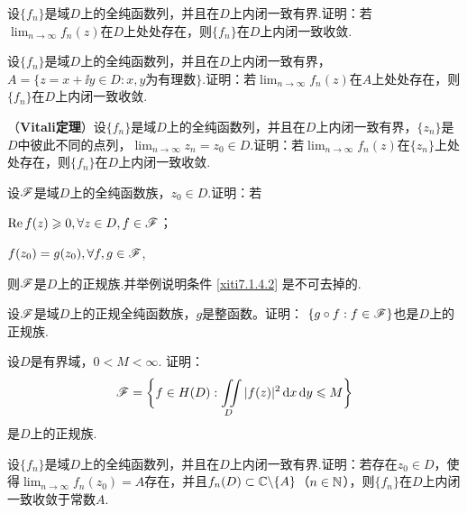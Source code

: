 \begin{xiti}
\item 设$\{f_n\}$是域$D$上的全纯函数列，并且在$D$上内闭一致有界.证明：若$\lim_{n\to\infty}f_n(z)$在$D$上处处存在，则$\{f_n\}$在$D$上内闭一致收敛.
\item 设$\{f_n\}$是域$D$上的全纯函数列，并且在$D$上内闭一致有界，$A=\{z=x+\ii y\in D:x,y\text{为有理数}\}$.证明：若$\lim_{n\to\infty}f_n(z)$在$A$上处处存在，则$\{f_n\}$在$D$上内闭一致收敛.
\item （\textbf{Vitali定理}）设$\{f_n\}$是域$D$上的全纯函数列，并且在$D$上内闭一致有界，$\{z_n\}$是$D$中彼此不同的点列，$\lim_{n\to\infty}z_n=z_0\in D$.证明：若$\lim_{n\to\infty}f_n(z)$在$\{z_n\}$上处处存在，则$\{f_n\}$在$D$上内闭一致收敛.
\item 设$\mathscr F$是域$D$上的全纯函数族，$z_0\in D$.证明：若
\begin{enuma}
  \item $\operatorname{Re} f(z)\geqslant0,\forall z\in D,f\in\mathscr F$；
  \item \label{xiti7.1.4.2}$f(z_0)=g(z_0),\forall f,g\in\mathscr F$,
\end{enuma}
则$\mathscr F$是$D$上的正规族.并举例说明条件 \ref{xiti7.1.4.2} 是不可去掉的.
\item 设$\mathscr F$是域$D$上的正规全纯函数族，$g$是整函数。证明：
$\{g\circ f:f\in\mathscr F\}$也是$D$上的正规族.
\item 设$D$是有界域，$0<M<\infty$. 证明：
\[\mathscr F=\bigg\{f\in H(D):\iint\limits_D|f(z)|^2\mathop{}\!\mathrm dx\mathop{}\!\mathrm dy\leqslant M\bigg\}\]
是$D$上的正规族.
\item 设$\{f_n\}$是域$D$上的全纯函数列，并且在$D$上内闭一致有界.证明：若存在$z_0\in D$，使
得$\lim_{n\to\infty}f_n(z_0)=A$存在，并且$f_n(D)\subset\mathbb C\backslash\{A\}$（$n\in\mathbb N$），则$\{f_n\}$在$D$上内闭一致收敛于常数$A$.
\end{xiti}


